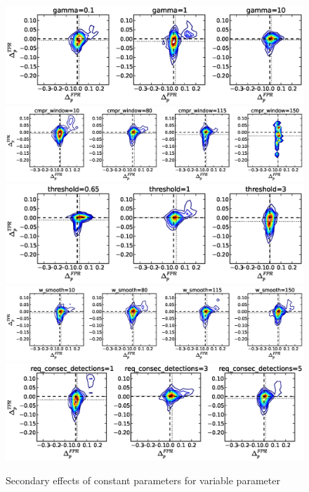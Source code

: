 \begin{figure}[!h]
\begin{center}
\includegraphics[width=6in]{../fig/final/delta_hist_sec/detection_window_hrs/gamma}
\includegraphics[width=6in]{../fig/final/delta_hist_sec/detection_window_hrs/cmpr_window}
\includegraphics[width=6in]{../fig/final/delta_hist_sec/detection_window_hrs/threshold}
\includegraphics[width=6in]{../fig/final/delta_hist_sec/detection_window_hrs/w_smooth}
\includegraphics[width=6in]{../fig/final/delta_hist_sec/detection_window_hrs/req_consec_detections}
\end{center}
\caption{\label{fig:delta_sec5} Secondary effects of constant parameters for variable parameter }
\end{figure}

